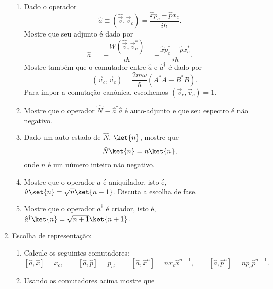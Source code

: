 \begin{enumerate}
\begin{enumerate}
              \item Dado o operador $$\hat{a} \equiv \left(\hat{\vec{v}}, \vec{v}_c\right) =
                        \frac{\hat{x}p_c - \hat{p}x_c}{i\hbar}.$$
                    Mostre que seu adjunto é dado por
                    \begin{equation*}
                        \hat{a}^\dagger = -\frac{W(\hat{\vec{v}},\vec{v}_c^*)}{i\hbar} =
                        -\frac{\hat{x}p_c^* - \hat{p}x_c^*}{i\hbar}.
                    \end{equation*}
                    Mostre também que o comutador entre $\hat{a}$ e $\hat{a}^\dagger$ é dado por
                    \begin{equation*}
                        [\hat{a}, \hat{a}^\dagger] =
                        \left(\vec{v}_c, \vec{v}_c\right) = \frac{2m\omega}{\hbar}\left(A^*A - B^*B\right).
                    \end{equation*}
                    Para impor a comutação canônica, escolhemos $\left(\vec{v}_c, \vec{v}_c\right)=1$.
              \item Mostre que o operador $\hat{N} \equiv \hat{a}^\dagger\hat{a}$ é
                    auto-adjunto e que seu espectro é não negativo.
              \item Dado um auto-estado de $\hat{N}$, $\ket{n}$, mostre que
                    \begin{equation*}
                        \hat{N}\ket{n} = n\ket{n},
                    \end{equation*}
                    onde $n$ é um número inteiro não negativo.
              \item Mostre que o operador $\hat{a}$ é aniquilador, isto é,
                    $\hat{a}\ket{n} = \sqrt{n}\ket{n-1}$. Discuta a escolha de fase.
              \item Mostre que o operador $\hat{a}^\dagger$ é criador, isto é,
                    $\hat{a}^\dagger\ket{n} = \sqrt{n+1}\ket{n+1}$.
          \end{enumerate}
    \item Escolha de representação:
          \begin{enumerate}
              \item Calcule os seguintes comutadores:
                    $$[\hat{a}, \hat{x}] = x_c,\qquad [\hat{a}, \hat{p}] = p_c, \qquad
                        [\hat{a}, \hat{x}^n] = nx_c\hat{x}^{n-1}, \qquad [\hat{a}, \hat{p}^n] = np_c\hat{p}^{n-1}.$$
              \item Usando os comutadores acima mostre que

\end{enumerate}
\end{enumerate}
